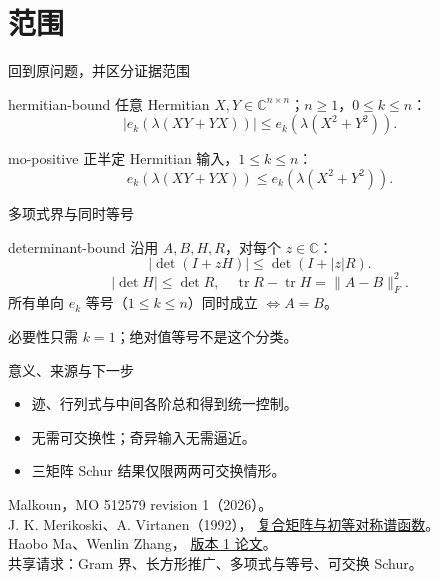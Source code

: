 \documentclass{beamer}
\begin{document}
\section{范围}
\begin{frame}{回到原问题，并区分证据范围}
\begin{bookresult}{hermitian-bound}
任意 Hermitian $X,Y\in\mathbb C^{n\times n}$；$n\geq1$，$0\leq k\leq n$：
\[
|e_k(\lambda(XY+YX))|\leq e_k(\lambda(X^2+Y^2)).
\]
\end{bookresult}
\begin{bookresult}{mo-positive}
正半定 Hermitian 输入，$1\leq k\leq n$：
\[
e_k(\lambda(XY+YX))\leq e_k(\lambda(X^2+Y^2)).
\]
\end{bookresult}
\end{frame}
\begin{frame}{多项式界与同时等号}
\begin{bookresult}{determinant-bound}
沿用 $A,B,H,R$，对每个 $z\in\mathbb C$：
\[
|\det(I+zH)|\leq\det(I+|z|R).
\]
\[
|\det H|\leq\det R,\quad
\operatorname{tr}R-\operatorname{tr}H=\|A-B\|_F^2.
\]
所有单向 $e_k$ 等号（$1\leq k\leq n$）同时成立
$\Longleftrightarrow A=B$。
\end{bookresult}
必要性只需 $k=1$；绝对值等号不是这个分类。
\end{frame}
\begin{frame}{意义、来源与下一步}
\begin{itemize}
\item 迹、行列式与中间各阶总和得到统一控制。
\item 无需可交换性；奇异输入无需逼近。
\item 三矩阵 Schur 结果仅限两两可交换情形。
\end{itemize}
\small
Malkoun，MO 512579 revision 1（2026）。\\
J. K. Merikoski、A. Virtanen（1992），
\href{https://doi.org/10.21136/cmj.1992.128332}{复合矩阵与初等对称谱函数}。\\
Haobo Ma、Wenlin Zhang，
\href{https://doi.org/10.5281/zenodo.23920583}{版本 1 论文}。\\
共享请求：Gram 界、长方形推广、多项式与等号、可交换 Schur。
\end{frame}
\appendix
\end{document}
